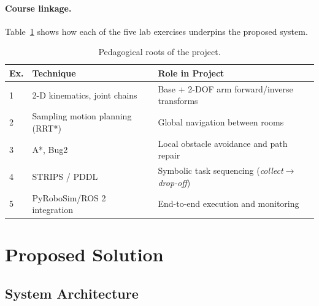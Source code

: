 \documentclass[11pt]{article}
\begin{document}
\paragraph{Course linkage.}  Table~\ref{tab:exercises} shows how each of the five lab exercises underpins the proposed system.

\begin{table}[h]
\centering
\begin{tabular}{@{}>{\raggedright}p{1.2cm}>{\raggedright}p{3cm}>{\raggedright\arraybackslash}p{7cm}@{}}
\toprule
\textbf{Ex.} & \textbf{Technique} & \textbf{Role in Project}\\ \midrule
1 & 2-D kinematics, joint chains & Base + 2-DOF arm forward/inverse transforms\\
2 & Sampling motion planning (RRT*) & Global navigation between rooms\\
3 & A*, Bug2 & Local obstacle avoidance and path repair\\
4 & STRIPS / PDDL & Symbolic task sequencing (\textit{collect}$\rightarrow$\textit{drop-off})\\
5 & PyRoboSim/ROS 2 integration & End-to-end execution and monitoring\\ \bottomrule
\end{tabular}
\caption{Pedagogical roots of the project.}
\label{tab:exercises}
\end{table}

\section{Proposed Solution}

\subsection{System Architecture}
\end{document}
